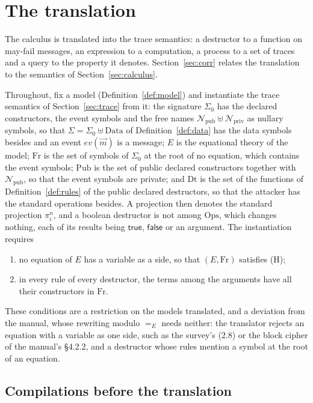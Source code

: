 \documentclass[11pt]{article}
\theoremstyle{definition}
\theoremstyle{plain}
\theoremstyle{remark}
\newcommand{\Fr}{\mathrm{Fr}}
\newcommand{\Ops}{\mathrm{Ops}}
\newcommand{\Pub}{\mathrm{Pub}}
\newcommand{\Dt}{\mathrm{Dt}}
\begin{document}
\section{The translation}\label{sec:translation}

The calculus is translated into the trace semantics: a destructor to a function on may-fail messages, an expression to a computation, a process to a set of traces and a query to the property it denotes. Section~\ref{sec:corr} relates the translation to the semantics of Section~\ref{sec:calculus}.

Throughout, fix a model (Definition~\ref{def:model}) and instantiate the trace semantics of Section~\ref{sec:trace} from it: the signature $\Sigma_0$ has the declared constructors, the event symbols and the free names $\mathcal{N}_{\mathrm{pub}}\uplus\mathcal{N}_{\mathrm{priv}}$ as nullary symbols, so that $\Sigma=\Sigma_0\uplus\mathrm{Data}$ of Definition~\ref{def:data} has the data symbols besides and an event $ev(\vec m)$ is a message; $E$ is the equational theory of the model; $\Fr$ is the set of symbols of $\Sigma_0$ at the root of no equation, which contains the event symbols; $\Pub$ is the set of public declared constructors together with $\mathcal{N}_{\mathrm{pub}}$, so that the event symbols are private; and $\Dt$ is the set of the functions of Definition~\ref{def:rules} of the public declared destructors, so that the attacker has the standard operations besides. A projection then denotes the standard projection $\pi^n_i$, and a boolean destructor is not among $\Ops$, which changes nothing, each of its results being $\mathsf{true}$, $\mathsf{false}$ or an argument. The instantiation requires
\begin{enumerate}
\item[(R1)] no equation of $E$ has a variable as a side, so that $(E,\Fr)$ satisfies (H);
\item[(R2)] in every rule of every destructor, the terms among the arguments have all their constructors in $\Fr$.
\end{enumerate}
These conditions are a restriction on the models translated, and a deviation from the manual, whose rewriting modulo $=_E$ needs neither: the translator rejects an equation with a variable as one side, such as the survey's (2.8) or the block cipher of the manual's \S4.2.2, and a destructor whose rules mention a symbol at the root of an equation.

\subsection{Compilations before the translation}\label{sec:compile}
\end{document}
